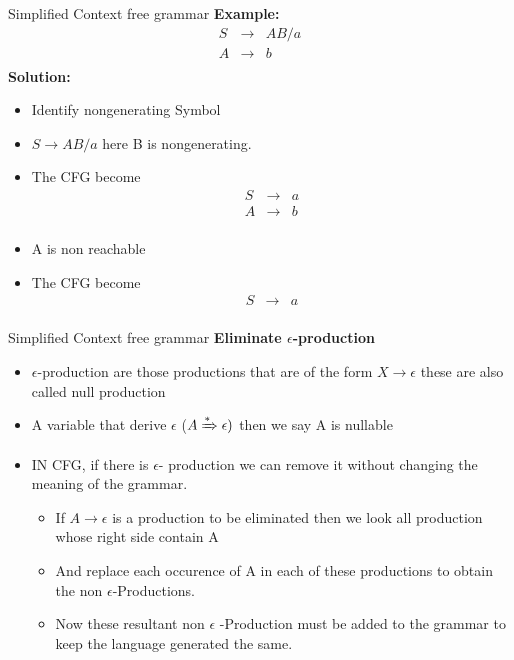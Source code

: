 \documentclass{beamer}
\begin{document}
\begin{frame}{Simplified Context free grammar}
	\textbf{Example:}
	\begin{eqnarray*}
		S&\rightarrow& AB/a\\
		A&\rightarrow& b\\
	\end{eqnarray*}
\textbf{Solution:}
\begin{itemize}
	\item Identify nongenerating Symbol
	\item $S\rightarrow AB/a$ here B is nongenerating.
	\item The CFG become
		\begin{eqnarray*}
		S&\rightarrow& a\\
		A&\rightarrow& b\\
	\end{eqnarray*}
\item A is non reachable
\item The CFG become
\begin{eqnarray*}
	S&\rightarrow& a\\
\end{eqnarray*}
\end{itemize}
\end{frame}
\begin{frame}{Simplified Context free grammar}
	\textbf{Eliminate $\epsilon$-production}
	\begin{itemize}
		\item $\epsilon$-production are those productions that are of the form $X\rightarrow \epsilon $ these are also called null production
		\item A variable that derive $\epsilon$ ($A \xRightarrow{*} \epsilon)$  then we say A is nullable
		\item IN CFG, if there is $\epsilon$- production we can remove it without changing the meaning of the grammar.
		\begin{itemize}
			\item If $A\rightarrow \epsilon$ is a production to be eliminated then we look all production whose right side contain A
			\item And replace each occurence of A in each of these productions to obtain the non $\epsilon$-Productions.
			\item Now these resultant non $\epsilon$ -Production must be added to the grammar to keep the language generated the same.
		\end{itemize}
	\end{itemize}	
\end{frame}
\end{document}
